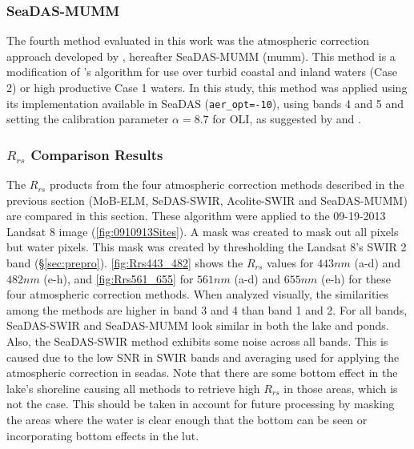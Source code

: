 \subsubsection{SeaDAS-MUMM}
The fourth method evaluated in this work was the atmospheric correction approach developed by \cite{Ruddick:2000bs}, hereafter SeaDAS-MUMM (\acrfull{mumm}). This method is a modification of \cite{Gordon:1994}'s algorithm for use over turbid coastal and inland waters (Case 2) or high productive Case 1 waters. In this study, this method was applied using its implementation available in SeaDAS ({\tt aer\_opt=-10}), using bands 4 and 5 and setting the calibration parameter $\alpha=8.7$ for OLI, as suggested by \cite{Vanhellemont2014} and \cite{Vanhellemont2014a}. 

\subsubsection{\texorpdfstring{$R_{rs}$}{Rrs} Comparison Results}

The $R_{rs}$ products from the four atmospheric correction methods described in the previous section (MoB-ELM, SeDAS-SWIR, Acolite-SWIR and SeaDAS-MUMM) are compared in this section. These algorithm were applied to the 09-19-2013 Landsat 8 image (\autoref{fig:0910913Sites}). A mask was created to mask out all pixels but water pixels. This mask was created by thresholding the Landsat 8's SWIR 2 band (\S\ref{sec:prepro}). \autoref{fig:Rrs443_482} shows the $R_{rs}$ values for $443nm$ (a-d) and $482nm$ (e-h), and \autoref{fig:Rrs561_655} for $561nm$ (a-d) and $655nm$ (e-h) for these four atmospheric correction methods. When analyzed visually, the similarities among the methods are higher in band 3 and 4 than band 1 and 2. For all bands, SeaDAS-SWIR and SeaDAS-MUMM look similar in both the lake and ponds. Also, the SeaDAS-SWIR method exhibits some noise across all bands. This is caused due to the low SNR in SWIR bands and averaging used for applying the \cite{Gordon:1994} atmospheric correction in \gls{seadas}.  Note that there are some bottom effect in the lake's shoreline causing all methods to retrieve high $R_{rs}$ in those areas, which is not the case. This should be taken in account for future processing by masking the areas where the water is clear enough that the bottom can be seen or incorporating bottom effects in the \gls{lut}.

